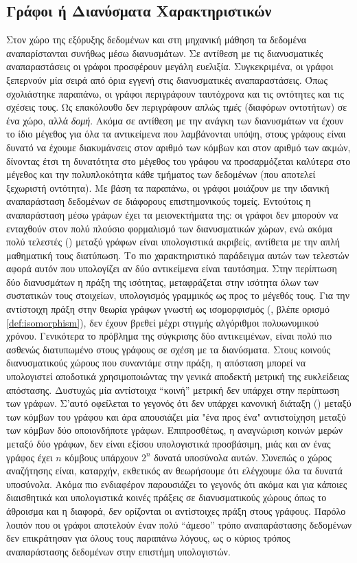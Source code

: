 \subsection{Γράφοι ή Διανύσματα Χαρακτηριστικών}
Στον χώρο της εξόρυξης δεδομένων και στη μηχανική μάθηση τα δεδομένα αναπαρίστανται συνήθως μέσω διανυσμάτων.
Σε αντίθεση με τις διανυσματικές αναπαραστάσεις οι γράφοι προσφέρουν μεγάλη ευελιξία.
Συγκεκριμένα, οι γράφοι ξεπερνούν μία σειρά από όρια εγγενή στις διανυσματικές αναπαραστάσεις.
Όπως σχολιάστηκε παραπάνω, οι γράφοι περιγράφουν ταυτόχρονα και τις οντότητες και τις σχέσεις τους.
Ως επακόλουθο δεν περιγράφουν απλώς \textit{τιμές} (διαφόρων οντοτήτων) σε ένα χώρο, αλλά \textit{δομή}.
Ακόμα σε αντίθεση με την ανάγκη των διανυσμάτων να έχουν το ίδιο μέγεθος για όλα τα αντικείμενα που λαμβάνονται υπόψη, στους γράφους είναι δυνατό να έχουμε διακυμάνσεις στον αριθμό των κόμβων και στον αριθμό των ακμών, δίνοντας έτσι τη δυνατότητα στο μέγεθος του γράφου να προσαρμόζεται καλύτερα στο μέγεθος και την πολυπλοκότητα κάθε τμήματος των δεδομένων (που αποτελεί ξεχωριστή οντότητα).
Με βάση τα παραπάνω, οι γράφοι μοιάζουν με την ιδανική αναπαράσταση δεδομένων σε διάφορους επιστημονικούς τομείς.
Εντούτοις η αναπαράσταση μέσω γράφων έχει τα μειονεκτήματα της: οι γράφοι δεν μπορούν να ενταχθούν στον πολύ πλούσιο φορμαλισμό των διανυσματικών χώρων, ενώ ακόμα πολύ τελεστές () μεταξύ γράφων είναι υπολογιστικά ακριβείς, αντίθετα με την απλή μαθηματική τους διατύπωση.
Το πιο χαρακτηριστικό παράδειγμα αυτών των τελεστών αφορά αυτόν που υπολογίζει αν δύο αντικείμενα είναι ταυτόσημα.
Στην περίπτωση δύο διανυσμάτων η πράξη της ισότητας, μεταφράζεται στην ισότητα όλων των συστατικών τους στοιχείων, υπολογισμός γραμμικός ως προς το μέγεθός τους.
Για την αντίστοιχη πράξη στην θεωρία γράφων γνωστή ως ισομορφισμός (, βλέπε ορισμό \ref{def:isomorphism}), δεν έχουν βρεθεί μέχρι στιγμής αλγόριθμοι πολυωνυμικού χρόνου.
Γενικότερα το πρόβλημα της σύγκρισης δύο αντικειμένων, είναι πολύ πιο ασθενώς διατυπωμένο στους γράφους σε σχέση με τα διανύσματα.
Στους κοινούς διανυσματικούς χώρους που συναντάμε στην πράξη, η απόσταση μπορεί να υπολογιστεί αποδοτικά χρησιμοποιώντας την γενικά αποδεκτή μετρική της ευκλείδειας απόστασης.
Δυστυχώς μία αντίστοιχα ``κοινή'' μετρική δεν υπάρχει στην περίπτωση των γράφων.
Σ'αυτό οφείλεται το γεγονός ότι δεν υπάρχει κανονική διάταξη () μεταξύ των κόμβων του γράφου και άρα απουσιάζει μία "ένα προς ένα" αντιστοίχηση μεταξύ των κόμβων δύο οποιονδήποτε γράφων.
Επιπροσθέτως, η αναγνώριση κοινών μερών μεταξύ δύο γράφων, δεν είναι εξίσου υπολογιστικά προσβάσιμη, μιάς και αν ένας γράφος έχει $n$ κόμβους υπάρχουν $2^{n}$ δυνατά υποσύνολα αυτών.
Συνεπώς ο χώρος αναζήτησης είναι, καταρχήν, εκθετικός αν θεωρήσουμε ότι ελέγχουμε όλα τα δυνατά υποσύνολα.
Ακόμα πιο ενδιαφέρον παρουσιάζει το γεγονός ότι ακόμα και για κάποιες διαισθητικά και υπολογιστικά κοινές πράξεις σε διανυσματικούς χώρους όπως το άθροισμα και η διαφορά, δεν ορίζονται οι αντίστοιχες πράξη στους γράφους.
Παρόλο λοιπόν που οι γράφοι αποτελούν έναν πολύ ``άμεσο'' τρόπο αναπαράστασης δεδομένων δεν επικράτησαν για όλους τους παραπάνω λόγους, ως ο κύριος τρόπος αναπαράστασης δεδομένων στην επιστήμη υπολογιστών.
